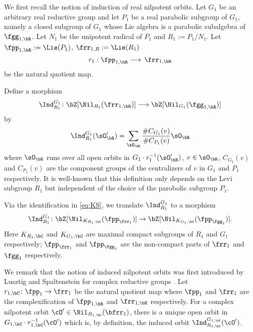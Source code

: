 \documentclass[12pt,a4paper]{amsart}
\numberwithin{equation}{section}
\theoremstyle{remark}
\begin{document}
We first recall the notion of induction of real nilpotent orbits. Let $G_1$ be
an arbitrary real reductive group and let $P_1$ be a real parabolic subgroup of
$G_1$, namely a closed subgroup of $G_1$ whose Lie algebra is a parabolic
subalgebra of $\fgg_{1,\bR}$. Let $N_1$ be the unipotent radical of $P_1$ and
$R_1:=P_1/N_1$. Let $\fpp_{1,\bR} := \Lie(P_1)$, $\frr_{1,R} := \Lie(R_1)$
\[
r_1:  \fpp_{1, \bR} \longrightarrow  \, \frr_{1, \bR}
\]
be the natural quotient map.

Define a morphism
\[
  \Indrg \colon \bZ[\Nil_{\Ror}(\frror)]\longrightarrow  \bZ[\Nil_{\Gor}(\fggor)]
\]
by
\[
  \Indrg (\sOpr) =  \sum_{\sOr} \frac{\# C_{G_1}(v)}{\#
  C_{P_1}(v)} \sOr
\]
where $\sOr$ runs over all open orbits in $G_1\cdot r_1^{-1}(\sOpr)$,
$v\in \sOr$, $C_{G_2}(v)$ and $C_{P_1}(v)$ are the component groups of the
centralizers of $v$ in $G_1$ and $P_1$ respectively. It is well-known that this definition only depends on the Levi subgroup $R_1$ but independent of the choice
of the parobolic subgroup $P_1$.

Via the identification in \eqref{eq:KS}, we translate  $\Ind_{R_1}^{G_1}$  to a morphism
\[
  \Ind_{R_1}^{G_1}\colon \bZ[\Nil_{K_{R_1,\bC}}(\fpp_{\frr_1})]\rightarrow
\bZ[\Nil_{K_{G_1,\bC}}(\fpp_{\fgg_1})].
\]
Here $K_{R_1,\bC}$ and $K_{G_1,\bC}$
are maximal compact subgroups of $R_1$ and $G_1$ respectively; $\fpp_{\frr_1}$
and $\fpp_{\fgg_1}$ are the non-compact parts of $\frr_1$ and $\fgg_1$ respectively.

We remark that the notion of induced nilpotent orbits was first
introduced by Lusztig and Spaltenstein for complex reductive groups \cite{LS}.
Let $r_{1,\bC}\colon \fpp_1 \rightarrow \frr_1$ be the natural quotient map
where $\fpp_1$ and $\frr_1$ are the complexification of $\fpp_{1,\bR}$ and
$\frr_{1,\bR}$ respectively.
For a complex nilpotent orbit $\cO'\in \Nil_{R_{1,\bC}}(\bfrr_1)$, there is a
unique open orbit in $G_{1,\bC}\cdot r_{1,\bC}^{-1}(\cO')$ which is, by definition, the induced orbit $\Indrgc(\cO')$.

\end{document}
